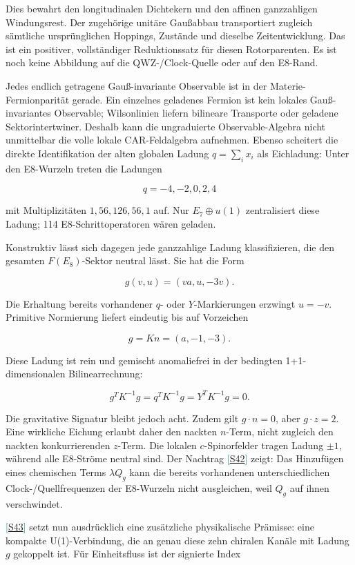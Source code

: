 \documentclass[11pt,a4paper,oneside,parskip=half,headings=normal,numbers=noenddot,bibliography=totoc]{scrreprt}
\newcommand{\src}[1]{\textcolor{teal}{\small[\hyperref[s:#1]{S#1}]}}
\begin{document}
Dies bewahrt den longitudinalen Dichtekern und den affinen ganzzahligen Windungsrest. Der zugehörige unitäre Gaußabbau transportiert zugleich sämtliche ursprünglichen Hoppings, Zustände und dieselbe Zeitentwicklung. Das ist ein positiver, vollständiger Reduktionssatz für diesen Rotorparenten. Es ist noch keine Abbildung auf die QWZ-/Clock-Quelle oder auf den E8-Rand.

Jedes endlich getragene Gauß-invariante Observable ist in der Materie-Fermionparität gerade. Ein einzelnes geladenes Fermion ist kein lokales Gauß-invariantes Observable; Wilsonlinien liefern bilineare Transporte oder geladene Sektorintertwiner. Deshalb kann die ungraduierte Observable-Algebra nicht unmittelbar die volle lokale CAR-Feldalgebra aufnehmen. Ebenso scheitert die direkte Identifikation der alten globalen Ladung \(q=\sum_i x_i\) als Eichladung: Unter den E8-Wurzeln treten die Ladungen

\[
q=-4,-2,0,2,4
\]

mit Multiplizitäten \(1,56,126,56,1\) auf. Nur \(E_7\oplus u(1)\) zentralisiert diese Ladung; 114 E8-Schrittoperatoren wären geladen.

Konstruktiv lässt sich dagegen jede ganzzahlige Ladung klassifizieren, die den gesamten \(F(E_8)\)-Sektor neutral lässt. Sie hat die Form

\[
g(v,u)=(va,u,-3v).
\]

Die Erhaltung bereits vorhandener \(q\)- oder \(Y\)-Markierungen erzwingt \(u=-v\). Primitive Normierung liefert eindeutig bis auf Vorzeichen

\[
\boxed{g=Kn=(a,-1,-3).}
\]

Diese Ladung ist rein und gemischt anomaliefrei in der bedingten 1+1-dimensionalen Bilinearrechnung:

\[
g^TK^{-1}g=q^TK^{-1}g=Y^TK^{-1}g=0.
\]

Die gravitative Signatur bleibt jedoch acht. Zudem gilt \(g\cdot n=0\), aber \(g\cdot z=2\). Eine wirkliche Eichung erlaubt daher den nackten \(n\)-Term, nicht zugleich den nackten konkurrierenden \(z\)-Term. Die lokalen \(c\)-Spinorfelder tragen Ladung \(\pm1\), während alle E8-Ströme neutral sind. Der Nachtrag \src{42} zeigt: Das Hinzufügen eines chemischen Terms \(\lambda Q_g\) kann die bereits vorhandenen unterschiedlichen Clock-/Quellfrequenzen der E8-Wurzeln nicht ausgleichen, weil \(Q_g\) auf ihnen verschwindet.

\src{43} setzt nun ausdrücklich eine zusätzliche physikalische Prämisse: eine kompakte U(1)-Verbindung, die an genau diese zehn chiralen Kanäle mit Ladung \(g\) gekoppelt ist. Für Einheitsfluss ist der signierte Index
\end{document}
